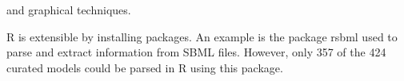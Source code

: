 \documentclass[portrait,a1paper,fontscale=0.46]{baposter}
\begin{document}
\begin{poster}
{\begin{multicols}{2}
{  {}
  }
  and graphical techniques.
  
  \end{multicols}
  \vspace{-0.5em}
  R is extensible by installing packages. An example is the package rsbml used to parse and extract information from SBML files. However, only 357 of the 424 curated models could be parsed in R using this package.
  
  }
  
\end{poster}
\end{document}

